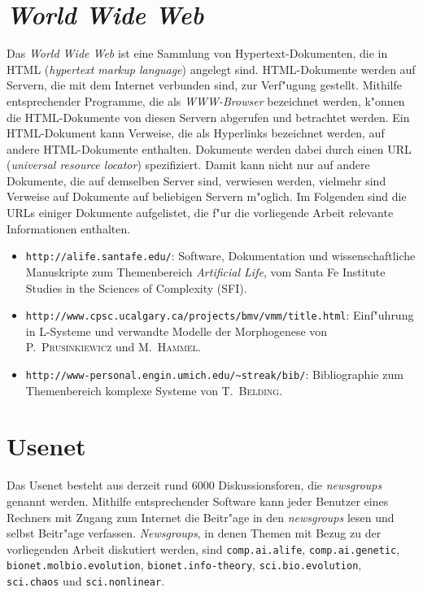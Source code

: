 \begin{appendix}
\section{\textsl{World Wide Web}}

Das \textsl{World Wide Web} ist eine Sammlung von Hypertext-Dokumenten, die in HTML
(\textsl{hypertext markup language}) angelegt sind. HTML-Dokumente werden auf Servern,
die mit dem Internet verbunden sind, zur Verf"ugung gestellt.
Mithilfe entsprechender Programme,
die als \textsl{WWW-Browser} bezeichnet werden, k"onnen die HTML-Dokumente von diesen
Servern abgerufen und betrachtet werden.  Ein HTML-Dokument kann
Verweise, die als Hyperlinks bezeichnet werden, auf andere HTML-Dokumente enthalten.
Dokumente werden dabei durch einen URL (\textsl{universal resource locator}) spezifiziert.
Damit kann nicht nur auf andere Dokumente, die auf demselben Server sind, verwiesen
werden, vielmehr sind Verweise auf Dokumente auf beliebigen Servern m"oglich. 
Im Folgenden sind die URLs einiger Dokumente aufgelistet, die f"ur die vorliegende Arbeit
relevante Informationen enthalten.

\begin{itemize}

\item \verb|http://alife.santafe.edu/|: Software, Dokumentation und wissenschaftliche Manuskripte
zum Themenbereich \textsl{Artificial Life}, vom Santa Fe Institute Studies in the Sciences of Complexity (SFI).

\item \verb|http://www.cpsc.ucalgary.ca/projects/bmv/vmm/title.html|: Einf"uhrung in L-Systeme und
verwandte Modelle der Morphogenese von \textsc{P.\ Prusinkiewicz} und \textsc{M.\ Hammel}.

\item \verb|http://www-personal.engin.umich.edu/~streak/bib/|: Bibliographie zum Themenbereich komplexe
Systeme von \textsc{T.\ Belding}.

\end{itemize}


\section{Usenet}

Das Usenet besteht aus derzeit rund 6000 Diskussionsforen, die {\slshape newsgroups}
genannt werden. Mithilfe entsprechender Software kann jeder Benutzer eines
Rechners mit Zugang zum Internet die Beitr"age in den {\slshape newsgroups}
lesen und selbst Beitr"age verfassen. \textsl{Newsgroups}, in denen Themen mit Bezug
zu der vorliegenden Arbeit diskutiert werden, sind \verb|comp.ai.alife|, \verb|comp.ai.genetic|,
\verb|bionet.molbio.evolution|, \verb|bionet.info-theory|, \verb|sci.bio.evolution|, 
\verb|sci.chaos| und \verb|sci.nonlinear|.




\end{appendix}
